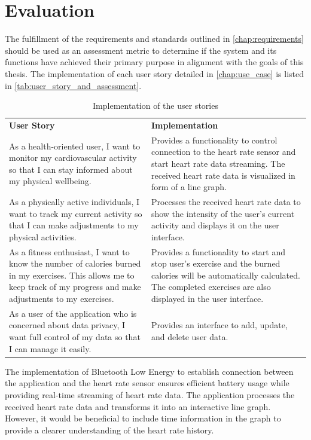 \section{Evaluation}
The fulfillment of the requirements and standards outlined in \autoref{chap:requirements} should be used as an assessment metric to determine if the system and its functions have achieved their primary purpose in alignment with the goals of this thesis. 
The implementation of each user story detailed in \autoref{chap:use_case} is listed in \autoref{tab:user_story_and_assessment}.
\clearpage
\begin{longtable}{p{} p{}}
    \label{tab:user_story_and_assessment}\\

    \caption{Implementation of the user stories}\\
        \hline
        \textbf{User Story} & \textbf{Implementation} \\
        \hline
        As a health-oriented user, I want to monitor my cardiovascular activity so that I can stay informed about my physical wellbeing. & Provides a functionality to control connection to the heart rate sensor and start heart rate data streaming. The received heart rate data is visualized in form of a line graph.\\
        \hline
        As a physically active individuals, I want to track my current activity so that I can make adjustments to my physical activities. & Processes the received heart rate data to show the intensity of the user's current activity and displays it on the user interface.\\    
        \hline
        As a fitness enthusiast, I want to know the number of calories burned in my exercises. This allows me to keep track of my progress and make adjustments to my exercises. & Provides a functionality to start and stop user's exercise and the burned calories will be automatically calculated. The completed exercises are also displayed in the user interface.\\
        \hline
        As a user of the application who is concerned about data privacy, I want full control of my data so that I can manage it easily.  & Provides an interface to add, update, and delete user data.\\
        \hline
\end{longtable}

The implementation of Bluetooth Low Energy to establish connection between the application and the heart rate sensor ensures efficient battery usage while providing real-time streaming of heart rate data. 
The application processes the received heart rate data and transforms it into an interactive line graph. 
However, it would be beneficial to include time information in the graph to provide a clearer understanding of the heart rate history.

